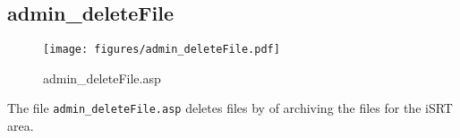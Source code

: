 \subsection{admin\_deleteFile}
\begin{figure}[htb]
    \begin{center}
        \texttt{[image: figures/admin\_deleteFile.pdf]}
    \end{center}
    \caption{admin\_deleteFile.asp}
    \label{fig:admin_deleteFile}
\end{figure}

The file \verb|admin_deleteFile.asp| deletes files by of archiving the files for
the iSRT area.
